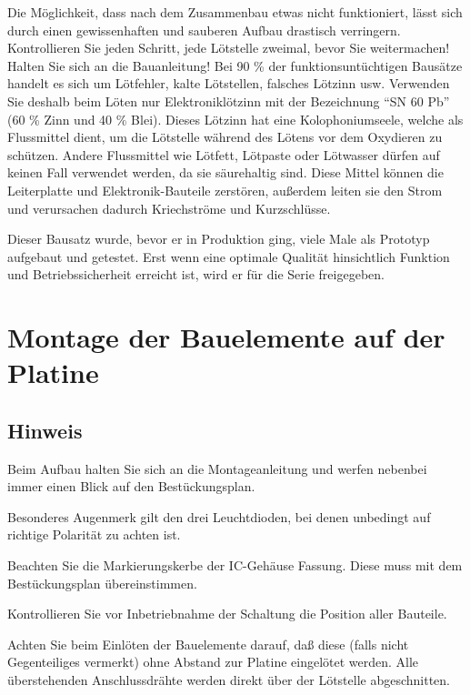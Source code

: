 \documentclass[fleqn,10pt]{SelfArx} %
\begin{document}
Die Möglichkeit, dass nach dem Zusammenbau etwas nicht funktioniert, lässt sich durch einen gewissenhaften und sauberen Aufbau drastisch verringern. Kontrollieren Sie jeden Schritt, jede Lötstelle zweimal, bevor Sie weitermachen! Halten Sie sich an die Bauanleitung! Bei 90 \% der funktionsuntüchtigen Bausätze handelt es sich um Lötfehler, kalte Lötstellen, falsches Lötzinn usw. Verwenden Sie deshalb beim Löten nur Elektroniklötzinn mit der Bezeichnung “SN 60 Pb” (60 \% Zinn und 40 \% Blei). Dieses Lötzinn hat eine Kolophoniumseele, welche als Flussmittel dient, um die Lötstelle während des Lötens vor dem Oxydieren zu schützen. Andere Flussmittel wie Lötfett, Lötpaste oder Lötwasser dürfen auf keinen Fall verwendet werden, da sie säurehaltig sind. Diese Mittel können die Leiterplatte und Elektronik-Bauteile zerstören, außerdem leiten sie den Strom und verursachen dadurch Kriechströme und Kurzschlüsse.

Dieser Bausatz wurde, bevor er in Produktion ging, viele Male als Prototyp aufgebaut und getestet. Erst wenn eine optimale Qualität hinsichtlich Funktion und Betriebssicherheit erreicht ist, wird er für die Serie freigegeben.


\section{Montage der Bauelemente auf der Platine}

 \subsection*{Hinweis}

Beim Aufbau halten Sie sich an die Montageanleitung und werfen nebenbei immer einen Blick auf den Bestückungsplan.

Besonderes Augenmerk gilt den drei Leuchtdioden, bei denen unbedingt auf richtige Polarität zu achten ist.

Beachten Sie die Markierungskerbe der IC-Gehäuse Fassung. Diese muss mit dem Bestückungsplan übereinstimmen.

Kontrollieren Sie vor Inbetriebnahme der Schaltung die Position aller Bauteile.

Achten Sie beim Einlöten der Bauelemente darauf, daß diese (falls nicht Gegenteiliges vermerkt) ohne Abstand zur Platine eingelötet werden. Alle überstehenden Anschlussdrähte werden direkt über der Lötstelle abgeschnitten.
\end{document}
